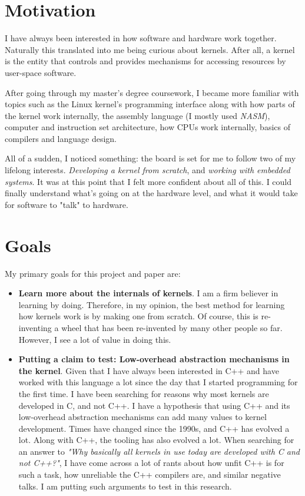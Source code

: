 \section{Motivation}
I have always been interested in how software and hardware work together. Naturally this translated into me being curious about kernels. After all, a kernel is the entity that controls and provides mechanisms for accessing resources by user-space software.

After going through my master's degree coursework, I became more familiar with topics such as the Linux kernel's programming interface along with how parts of the kernel work internally, the assembly language (I mostly used \textit{NASM}), computer and instruction set architecture, how CPUs work internally, basics of compilers and language design.

All of a sudden, I noticed something: the board is set for me to follow two of my lifelong interests. \textit{Developing a kernel from scratch}, and \textit{working with embedded systems}.
It was at this point that I felt more confident about all of this. I could finally understand what's going on at the hardware level, and what it would take for software to "talk" to hardware.

\section{Goals}
My primary goals for this project and paper are:
\begin{itemize}
    \item \textbf{Learn more about the internals of kernels}.
    I am a firm believer in learning by doing. Therefore, in my opinion, the best method for learning how kernels work is by making one from scratch. Of course, this is re-inventing a wheel that has been re-invented by many other people so far. However, I see a lot of value in doing this.

    \item \textbf{Putting a claim to test: Low-overhead abstraction mechanisms in the kernel}.
    Given that I have always been interested in C++ and have worked with this language a lot since the day that I started programming for the first time. I have been searching for reasons why most kernels are developed in C, and not C++. I have a hypothesis that using C++ and its low-overhead abstraction mechanisms can add many values to kernel development. Times have changed since the 1990s, and C++ has evolved a lot. Along with C++, the tooling has also evolved a lot. When searching for an answer to \textit{"Why basically all kernels in use today are developed with C and not C++?"}, I have come across a lot of rants about how unfit C++ is for such a task, how unreliable the C++ compilers are, and similar negative talks. I am putting such arguments to test in this research.
\end{itemize}

